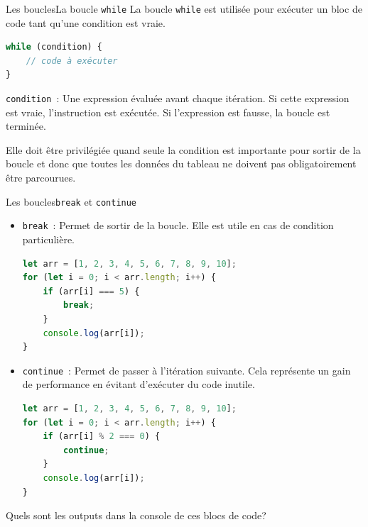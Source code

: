 \documentclass{beamer}
\begin{document}
    \begin{frame}[fragile]{Les boucles}{La boucle \lstinline{while}}
        La boucle \lstinline{while} est utilisée pour exécuter un bloc de code tant qu'une condition est vraie.
        \begin{lstlisting}[language=JavaScript,title={\scriptsize{Script JavaScript}}]
while (condition) {
    // code à exécuter
}
        \end{lstlisting}
        \lstinline{condition}~: Une expression évaluée avant chaque itération.
        Si cette expression est vraie, l'instruction est exécutée.
        Si l'expression est fausse, la boucle est terminée.
        \begin{dangercolorbox}
            Elle doit être privilégiée quand seule la condition est importante pour sortir de la boucle et donc que toutes les données du tableau ne doivent pas obligatoirement être parcourues.
        \end{dangercolorbox}
    \end{frame}

    \begin{frame}[fragile]{Les boucles}{\lstinline{break} et \lstinline{continue}}
        \begin{footnotesize}
            \begin{itemize}
                \item \lstinline{break}~: Permet de sortir de la boucle.
                Elle est utile en cas de condition particulière.
                \begin{lstlisting}[language=JavaScript,title={\scriptsize{Script JavaScript}},basicstyle=\tiny\ttfamily]
let arr = [1, 2, 3, 4, 5, 6, 7, 8, 9, 10];
for (let i = 0; i < arr.length; i++) {
    if (arr[i] === 5) {
        break;
    }
    console.log(arr[i]);
}
                \end{lstlisting}
                \item \lstinline{continue}~: Permet de passer à l'itération suivante.
                Cela représente un gain de performance en évitant d'exécuter du code inutile.
                \begin{lstlisting}[language=JavaScript,title={\scriptsize{Script JavaScript}},basicstyle=\tiny\ttfamily]
let arr = [1, 2, 3, 4, 5, 6, 7, 8, 9, 10];
for (let i = 0; i < arr.length; i++) {
    if (arr[i] % 2 === 0) {
        continue;
    }
    console.log(arr[i]);
}
                \end{lstlisting}
            \end{itemize}
        \end{footnotesize}
        Quels sont les outputs dans la console de ces blocs de code?
    \end{frame}
\end{document}
